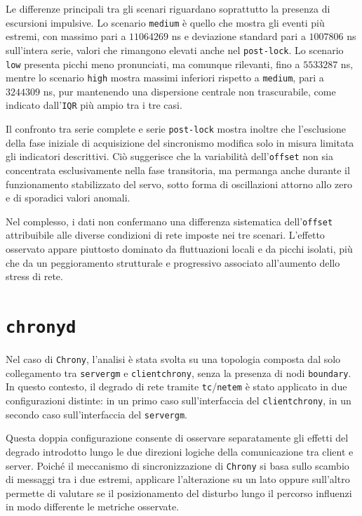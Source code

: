 Le differenze principali tra gli scenari riguardano soprattutto la presenza di
escursioni impulsive. Lo scenario \texttt{medium} è quello che mostra gli eventi
più estremi, con massimo pari a $11064269$ ns e deviazione standard pari a $10078
06$ ns sull’intera serie, valori che rimangono elevati anche nel \texttt{post-lock}.
Lo scenario \texttt{low} presenta picchi meno pronunciati, ma comunque rilevanti,
fino a $5533287$ ns, mentre lo scenario \texttt{high} mostra massimi inferiori rispetto
a \texttt{medium}, pari a $3244309$ ns, pur mantenendo una dispersione centrale
non trascurabile, come indicato dall’\texttt{IQR} più ampio tra i tre casi.

Il confronto tra serie complete e serie \texttt{post-lock} mostra inoltre che
l’esclusione della fase iniziale di acquisizione del sincronismo modifica solo
in misura limitata gli indicatori descrittivi. Ciò suggerisce che la variabilità dell’\texttt{offset}
non sia concentrata esclusivamente nella fase transitoria, ma permanga anche
durante il funzionamento stabilizzato del servo, sotto forma di oscillazioni attorno
allo zero e di sporadici valori anomali.

Nel complesso, i dati non confermano una differenza sistematica dell’\texttt{offset}
attribuibile alle diverse condizioni di rete imposte nei tre scenari. L’effetto osservato
appare piuttosto dominato da fluttuazioni locali e da picchi isolati, più che da
un peggioramento strutturale e progressivo associato all’aumento dello stress di
rete.

\section{\texttt{chronyd}}
Nel caso di \texttt{Chrony}, l’analisi è stata svolta su una topologia composta
dal solo collegamento tra \texttt{servergm} e \texttt{clientchrony}, senza la presenza
di nodi \texttt{boundary}. In questo contesto, il degrado di rete tramite
\texttt{tc}/\texttt{netem} è stato applicato in due configurazioni distinte: in un
primo caso sull’interfaccia del \texttt{clientchrony}, in un secondo caso sull’interfaccia
del \texttt{servergm}.

Questa doppia configurazione consente di osservare separatamente gli effetti del
degrado introdotto lungo le due direzioni logiche della comunicazione tra client
e server. Poiché il meccanismo di sincronizzazione di \texttt{Chrony} si basa
sullo scambio di messaggi tra i due estremi, applicare l’alterazione su un lato oppure
sull’altro permette di valutare se il posizionamento del disturbo lungo il percorso
influenzi in modo differente le metriche osservate.

